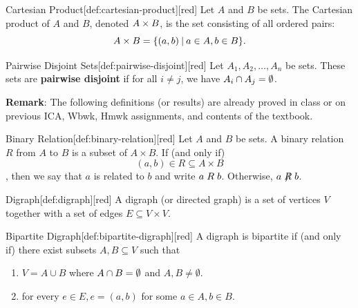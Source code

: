 \documentclass[10pt]{article}
\theoremstyle{definition}
\theoremstyle{plain}
\numberwithin{equation}{section}
\begin{document}
\begin{define}{Cartesian Product}[def:cartesian-product][red]
  Let $A$ and $B$ be sets. The Cartesian product of $A$ and $B$, denoted $A \sTIMES B$, is the set consisting of all ordered pairs:
  \[
  A \sTIMES B = \{(a, b) \LDIV a \in A, b \in B\}.
  \]
\end{define}
\begin{define}{Pairwise Disjoint Sets}[def:pairwise-disjoint][red]
  Let $A_1, A_2, \ldots, A_n$ be sets. These sets are \textbf{pairwise disjoint} if for all $i \neq j$, we have $A_i \sAND A_j = \emptyset$.
\end{define}





















  
\newpage
\textbf{Remark}: The following definitions (or results) are already proved in class or on previous ICA, 
Wbwk, Hmwk assignments, and contents of the textbook.


\begin{define}{Binary Relation}[def:binary-relation][red]
  Let $A$ and $B$ be sets. A binary relation $R$ from $A$ to $B$ is a subset of $A \times B$. 
  If (and only if) $$(a, b) \in R \subseteq A \times B$$, then we say 
  that $a$ is related to $b$ and write $\relation{a}{b}$. Otherwise, $\nrelation{a}{b}$.
\end{define}




\begin{define}{Digraph}[def:digraph][red]
  A digraph (or directed graph) is a set of vertices $V$ together with a set of edges $E \subseteq V \times V$.
\end{define}

\begin{define}{Bipartite Digraph}[def:bipartite-digraph][red]
  A digraph is bipartite if (and only if) there exist subsets $A, B \subseteq V$ such that 
  \begin{enumerate}
    \item $V=A \cup B$ where $A \sAND B=\emptyset$ and $A, B \neq \emptyset$.
    \item for every $e \in E, e=(a, b)$ for some $a \in A, b \in B$.
  \end{enumerate}
\end{define}
\end{document}

